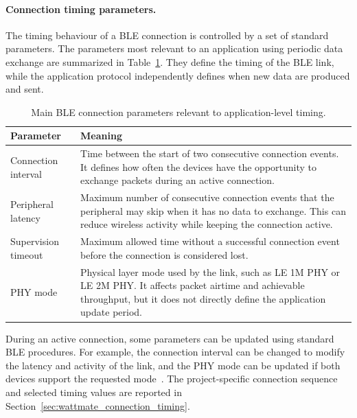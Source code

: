 \paragraph{Connection timing parameters.}
The timing behaviour of a BLE connection is controlled by a set of standard parameters. 
The parameters most relevant to an application using periodic data exchange are summarized in Table~\ref{tab:ble_connection_parameters}. 
They define the timing of the BLE link, while the application protocol independently defines when new data are produced and sent.

\begin{table}[H]
	\centering
	\small
	\caption{Main BLE connection parameters relevant to application-level timing.}
	\label{tab:ble_connection_parameters}
	\begin{tabularx}{\textwidth}{l X}
		\toprule
		\textbf{Parameter} &  \textbf{Meaning} \\
		\midrule
		Connection interval &
		Time between the start of two consecutive connection events. It defines how often the devices have the opportunity to exchange packets during an active connection. \\
		
		Peripheral latency &
		Maximum number of consecutive connection events that the peripheral may skip when it has no data to exchange. This can reduce wireless activity while keeping the connection active. \\
		
		Supervision timeout &
		Maximum allowed time without a successful connection event before the connection is considered lost. \\
		
		PHY mode &
		Physical layer mode used by the link, such as LE 1M PHY or LE 2M PHY. It affects packet airtime and achievable throughput, but it does not directly define the application update period. \\
		\bottomrule
	\end{tabularx}
\end{table}

During an active connection, some parameters can be updated using standard BLE procedures. 
For example, the connection interval can be changed to modify the latency and activity of the link, and the PHY mode can be updated if both devices support the requested mode~\cite{bluetooth_core_link_layer}. 
The project-specific connection sequence and selected timing values are reported in Section~\ref{sec:wattmate_connection_timing}.



